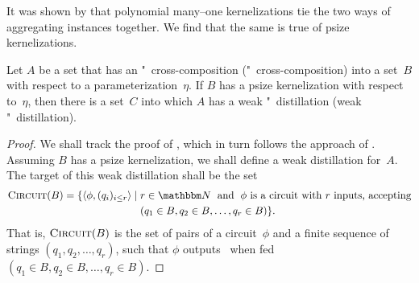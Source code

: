 It was shown by \textcite{bodlaender2009problems,bodlaender2014kernelization} that polynomial many--one kernelizations tie the two ways of aggregating instances together.
We find that the same is true of psize kernelizations.

\begin{theorem}
\label{thm:distillation}%
  Let $A$ be a set that has an "~cross-composition ("~cross-composition) into a set~$B$ with respect to a parameterization~$\eta$.
  If $B$ has a psize kernelization with respect to~$\eta$, then there is a set~$C$ into which $A$ has a weak "~distillation (weak "~distillation).
\end{theorem}
\begin{proof}
  We shall track the proof of \textcite[Theorem~3.4]{bodlaender2014kernelization}, which in turn follows the approach of \textcite[Lemma~2]{bodlaender2009problems}.
  Assuming $B$ has a psize kernelization, we shall define a weak distillation for~$A$.
  The target of this weak distillation shall be the set
  \begin{align*}
    \pr{Circuit}(B) \deq \{\pair{\phi}{(q_i)_{i \le r}} \st &r \in \bbN \reland \text{$\phi$ is a circuit with $r$ inputs, accepting} \\
      &(q_1 \in B, q_2 \in B, \ldots, q_r \in B)\}.
  \end{align*}
  That is, $\textnormal{\textsc{Circuit}}(B)$ is the set of pairs of a circuit~$\phi$ and a finite sequence of strings $(q_1, q_2, \ldots, q_r)$, such that $\phi$ outputs~ when fed $(q_1 \in B, q_2 \in B, \ldots, q_r \in B)$.


\end{proof}
